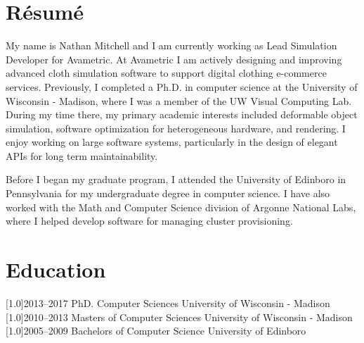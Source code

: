 \documentclass{cv-style}     %
\begin{document}
\section{R\'{e}sum\'{e}}
\vspace{-0.2cm} My name is Nathan Mitchell and I
am currently working as Lead Simulation Developer
for Avametric. At Avametric I am actively
designing and improving advanced cloth simulation
software to support digital clothing e-commerce
services. Previously, I completed a Ph.D. in
computer science at the University of Wisconsin -
Madison, where I was a member of the UW Visual
Computing Lab. During my time there, my primary
academic interests included deformable object
simulation, software optimization for heterogeneous
hardware, and rendering. I enjoy working on large
software systems, particularly in the design of
elegant APIs for long term maintainability.

Before I began my graduate program, I attended the
University of Edinboro in Pennsylvania for my
undergraduate degree in computer science. I have
also worked with the Math and Computer Science
division of Argonne National Labs, where I helped
develop software for managing cluster
provisioning. 

\section{Education}
  \vspace{-0.2cm}
\begin{entrylist}
\entry
{\scalebox{.8}[1.0]{2013--2017}}
{PhD. Computer Sciences}
{University of Wisconsin - Madison}
{}
\entry
{\scalebox{.8}[1.0]{2010--2013}}
{Masters of Computer Sciences}
{University of Wisconsin - Madison}
{}
\entry
{\scalebox{.8}[1.0]{2005--2009}}
{Bachelors of Computer Science}
{University of Edinboro}
{}
\end{entrylist}
  \vspace{-0.2cm}
\end{document}
